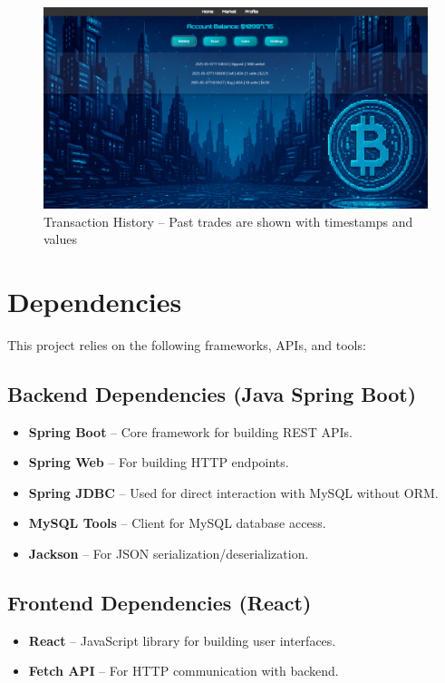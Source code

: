 \documentclass[a4paper,12pt]{article}
\begin{document}
\begin{figure}[H]
    \centering
    \includegraphics[width=1.0\textwidth]{transactions.png}
    \caption{Transaction History – Past trades are shown with timestamps and values}
\end{figure}

\section{Dependencies}

This project relies on the following frameworks, APIs, and tools:

\subsection{Backend Dependencies (Java Spring Boot)}
\begin{itemize}[label=-, itemsep=0.2em]
    \item \textbf{Spring Boot} – Core framework for building REST APIs.
    \item \textbf{Spring Web} – For building HTTP endpoints.
    \item \textbf{Spring JDBC} – Used for direct interaction with MySQL without ORM.
    \item \textbf{MySQL Tools} – Client for MySQL database access.
    \item \textbf{Jackson} – For JSON serialization/deserialization.
\end{itemize}

\subsection{Frontend Dependencies (React)}
\begin{itemize}[label=-, itemsep=0.2em]
    \item \textbf{React} – JavaScript library for building user interfaces.
    \item \textbf{Fetch API} – For HTTP communication with backend.
\end{itemize}
\end{document}
